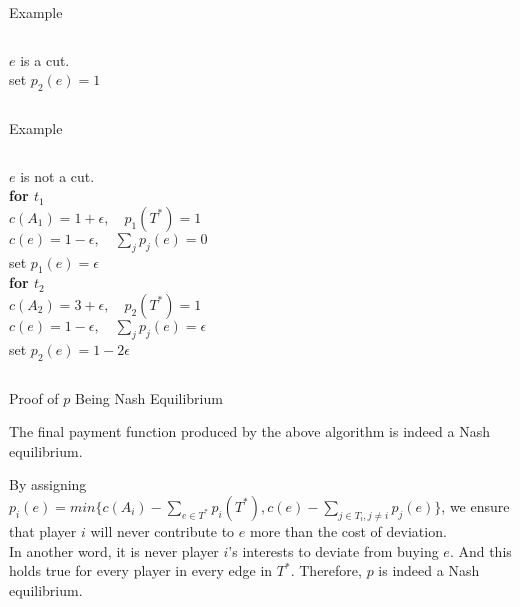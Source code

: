 \documentclass[11pt,aspectratio=169]{beamer}
\begin{document}
\begin{frame}{Example}
\begin{columns}
    \centering
\doublespacing
$e$ is a cut.\\
set $p_2(e) = 1$
\end{columns}
\end{frame}

\begin{frame}{Example}
\begin{columns}
    \centering
\doublespacing
$e$ is not a cut.\\
\textbf{for $t_1$}\\
$c(A_1) = 1+\epsilon, \quad  p_1(T^*) = 1$\\
$c(e) = 1-\epsilon, \quad \sum_{j}p_j(e) = 0$\\
set $p_1(e) = \epsilon$\\
\textbf{for $t_2$}\\
$c(A_2) = 3+\epsilon, \quad p_2(T^*) = 1$\\
$c(e) = 1-\epsilon,\quad  \sum_{j}p_j(e) = \epsilon$\\
set $p_2(e) = 1-2\epsilon$
\end{columns}
\end{frame}


\begin{frame}{Proof of \(p\) Being Nash Equilibrium}
\begin{corollary}
	The final payment function produced by the above algorithm is indeed a Nash equilibrium.
\end{corollary}
\vspace{10pt}
By assigning $p_i(e) = min\{c(A_i) - \sum_{e\in T^*}p_i(T^*), c(e) - \sum_{j\in T_i,j\neq i}p_j(e)\}$, we ensure that player \(i\) will never contribute to \(e\) more than the cost of deviation. \\
\vspace{10pt}
In another word, it is never player $i$'s interests to deviate from buying $e$. And this holds true for every player in every edge in $T^*$. Therefore, \(p\) is indeed a Nash equilibrium. 

\end{frame}
\end{document}
